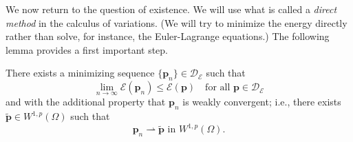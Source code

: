 We now return to the question of existence. We will use what is called a \emph{direct method} in the calculus of variations. (We will try to minimize the energy directly rather than solve, for instance, the Euler-Lagrange equations.) The following lemma provides a first important step.

\begin{Lemma}
\label{lem:elasticity-weakly-convergent-minimizing-sequence}
There exists a minimizing sequence $\{\bm{p}_n\}\in\mathcal{D}_{\mathcal{E}}$ such that
\begin{equation}\label{eq:elasticity-minimizing-sequence-energy-infimum}
\lim_{n\to\infty}\mathcal{E}(\bm{p}_n)\leq\mathcal{E}(\bm{p})\quad\text{for all }\bm{p}\in\mathcal{D}_{\mathcal{E}}
\end{equation}
and with the additional property that $\bm{p}_n$ is weakly convergent; i.e., there exists $\widetilde{\bm{p}}\in W^{1,p}(\Omega)$ such that
\begin{equation}\label{eq:elasticity-minimizing-sequence-weak-limit}
\bm{p}_n\rightharpoonup\widetilde{\bm{p}}\text{ in }W^{1,p}(\Omega).
\end{equation}

\end{Lemma}

